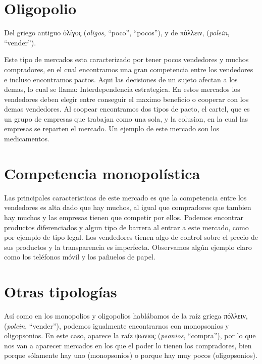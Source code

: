 \documentclass[
]{krantz}
\begin{document}
\hypertarget{oligopolio}{%
\section{Oligopolio}\label{oligopolio}}

Del griego antiguo ὀλίγος (\emph{oligos}, ``poco'', ``pocos''), y de πόλλειν, (\emph{polein}, ``vender'').

Este tipo de mercados esta caracterizado por tener pocos vendedores y muchos compradores, en el cual encontramos una gran competencia entre los vendedores e incluso encontramos pactos. Aqui las decisiones de un sujeto afectan a los demas, lo cual se llama: Interdependencia estrategica.
En estos mercados los vendedores deben elegir entre conseguir el maximo beneficio o cooperar con los demas vendedores. Al coopear encontramos dos tipos de pacto, el cartel, que es un grupo de empresas que trabajan como una sola, y la colusion, en la cual las empresas se reparten el mercado.
Un ejemplo de este mercado son los medicamentos.

\hypertarget{competencia-monopoluxedstica}{%
\section{Competencia monopolística}\label{competencia-monopoluxedstica}}

Las principales caracteristicas de este mercado es que la competencia entre los vendedores es alta dado que hay muchos, al igual que compradores que tambien hay muchos y las empresas tienen que competir por ellos. Podemos encontrar productos diferenciados y algun tipo de barrera al entrar a este mercado, como por ejemplo de tipo legal. Los vendedores tienen algo de control sobre el precio de sus productos y la transparencia es imperfecta.
Observamos algún ejemplo claro como los teléfonos móvil y los pañuelos de papel.

\hypertarget{otras-tipologuxedas}{%
\section{Otras tipologías}\label{otras-tipologuxedas}}

Así como en los monopolios y oligopolios hablábamos de la raíz griega πόλλειν, (\emph{polein}, ``vender''), podemos igualmente encontrarnos con monopsonios y oligopsonios. En este caso, aparece la raíz ψωνιος (\emph{psonios}, ``compra''), por lo que nos van a aparecer mercados en los que el poder lo tienen los compradores, bien porque sólamente hay uno (monopsonios) o porque hay muy pocos (oligopsonios).
\end{document}
